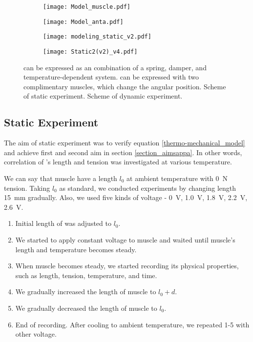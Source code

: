 \begin{figure}[t]
	\centering
	\begin{subfigure}[t]{0.25\textwidth}
		\centering\texttt{[image: Model\_muscle.pdf]}
		\caption{\label{ModelMus}}
	\end{subfigure}
	\begin{subfigure}[t]{0.30\textwidth}
		\centering\texttt{[image: Model\_anta.pdf]}
		\caption{\label{ModelAnt}}
	\end{subfigure}
	\begin{subfigure}[t]{0.18\textwidth}
		\centering\texttt{[image: modeling\_static\_v2.pdf]}
		\caption{\label{static_sch}}
	\end{subfigure}
	\begin{subfigure}[t]{0.18\textwidth}
		\centering\texttt{[image: Static2(v2)\_v4.pdf]} %
		\caption{\label{dynamic_sch}}
	\end{subfigure}
	\caption[Modeling of \scp]{ \scp can be expressed as an combination of a spring, damper, and temperature-dependent system.  \Anta can be expressed with two complimentary muscles, which change the angular position.  Scheme of static experiment.  Scheme of dynamic experiment.}
	\label{model+exp_sch}
\end{figure}

\subsection{Static Experiment}
The aim of static experiment was to verify equation \eqref{thermo-mechanical_model} and achieve first and second aim in section \ref{section_aimsappa}. In other words, correlation of \scpnospace's length and tension was investigated at various temperature. 

We can say that muscle have a length $l_{0}$ at ambient temperature with \SI{0}{\newton} tension. Taking $l_{0}$ as standard, we conducted experiments by changing length \SI{15}{\milli\meter} gradually. Also, we used five kinds of voltage - \SI{0}{\volt}, \SI{1.0}{\volt}, \SI{1.8}{\volt}, \SI{2.2}{\volt}, \SI{2.6}{\volt}.

\begin{enumerate}
\item Initial length of \scp was adjusted to $l_0$.
\item We started to apply constant voltage to muscle and waited until muscle's length and temperature becomes steady.
\item When muscle becomes steady, we started recording its physical properties, such as length, tension, temperature, and time.
\item We gradually increased the length of muscle to $l_0+d$.
\item We gradually decreased the length of muscle to $l_0$.
\item End of recording. After cooling to ambient temperature, we repeated 1-5 with other voltage.
\end{enumerate}

